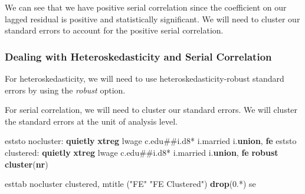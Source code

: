 \documentclass[
]{book}
\newenvironment{Shaded}{\begin{snugshade}}{\end{snugshade}}
\newcommand{\KeywordTok}[1]{\textcolor[rgb]{0.13,0.29,0.53}{\textbf{#1}}}
\newcommand{\NormalTok}[1]{#1}
\newcommand{\StringTok}[1]{\textcolor[rgb]{0.31,0.60,0.02}{#1}}
\begin{document}
We can see that we have positive serial correlation since the coefficient on our lagged residual is positive and statistically significant. We will need to cluster our standard errors to account for the positive serial correlation.

\subsubsection*{Dealing with Heteroskedasticity and Serial Correlation}\label{dealing-with-heteroskedasticity-and-serial-correlation}

For heteroskedasticity, we will need to use heteroskedasticity-robust standard errors by using the \emph{robust} option.

For serial correlation, we will need to cluster our standard errors. We will cluster the standard errors at the unit of analysis level.

\begin{Shaded}
\begin{Highlighting}[]
\NormalTok{eststo nocluster: }\KeywordTok{quietly} \KeywordTok{xtreg}\NormalTok{ lwage c.edu\#\#i.d8* i.married i.}\KeywordTok{union}\NormalTok{, }\KeywordTok{fe}
\NormalTok{eststo clustered: }\KeywordTok{quietly} \KeywordTok{xtreg}\NormalTok{ lwage c.edu\#\#i.d8* i.married i.}\KeywordTok{union}\NormalTok{, }\KeywordTok{fe} \KeywordTok{robust} \KeywordTok{cluster}\NormalTok{(}\KeywordTok{nr}\NormalTok{)}

\NormalTok{esttab nocluster clustered, mtitle (}\StringTok{"FE"} \StringTok{"FE Clustered"}\NormalTok{) }\KeywordTok{drop}\NormalTok{(0.*) se}
\end{Highlighting}
\end{Shaded}
\end{document}
